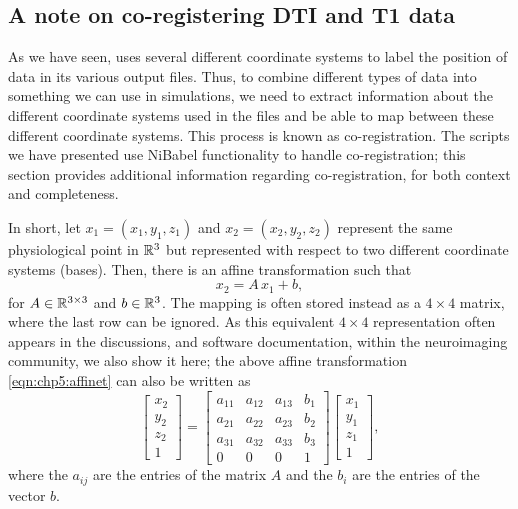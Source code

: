 \subsection{A note on co-registering DTI and T1 data}
\label{sec:chp-dti:freesurfer-coord}
As we have seen, {\freesurfer} uses several different coordinate
systems to label the position of data in its various output files.
Thus, to combine different types of data into something we can use in
{\fenics} simulations, we need to extract information about the
different coordinate systems used in the files and be able to map
between these different coordinate systems. This process is known as
co-registration. The scripts we have presented use NiBabel
functionality to handle co-registration; this section provides 
additional information regarding co-registration, for both context and
completeness.

In short, let $x_1 = (x_1, y_1, z_1)$ and $x_2 = (x_2, y_2, z_2)$ represent the
same physiological point in $\mathbb{R}^3$ but represented with respect to two
different coordinate systems (bases). Then, there is an affine
transformation such that
\begin{equation}\label{eqn:chp5:affinet}
x_2 = A\, x_1 + b,
\end{equation}
for $A \in \mathbb{R}^{3 \times 3}$ and $b \in \mathbb{R}^3$. The mapping is often
stored instead as a $4\times4$ matrix, where the last row can be
ignored.  As this equivalent $4\times 4$ representation often appears in the 
discussions, and software documentation, within the neuroimaging community, 
we also show it here; the above affine transformation \eqref{eqn:chp5:affinet} 
can also be written as 
\begin{equation*}
\left[\begin{array}{c}
x_{2}\\
y_{2}\\
z_{2}\\
1
\end{array}\right] = 
\left[
\begin{array}{cccc}
a_{11} & a_{12} & a_{13} & b_1 \\
a_{21} & a_{22} & a_{23} & b_2 \\
a_{31} & a_{32} & a_{33} & b_3 \\
0      &    0   &   0    & 1
\end{array}
\right]
\left[
\begin{array}{c}
x_1\\
y_1\\
z_1\\
1
\end{array}
\right],
\end{equation*}
where the $a_{ij}$ are the entries of the matrix $A$ and the $b_i$ are the 
entries of the vector $b$. 


